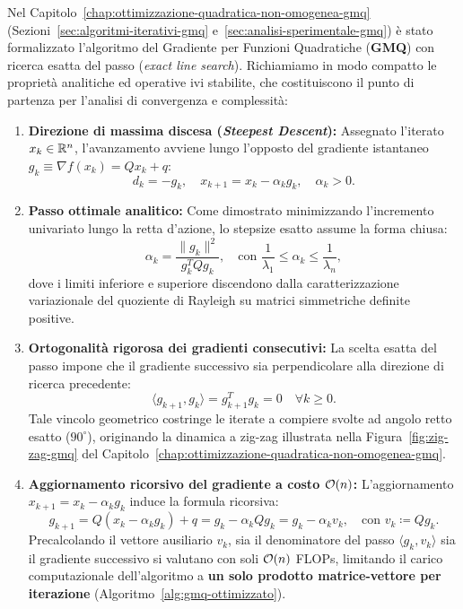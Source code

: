 Nel Capitolo~\ref{chap:ottimizzazione-quadratica-non-omogenea-gmq} (Sezioni~\ref{sec:algoritmi-iterativi-gmq} e~\ref{sec:analisi-sperimentale-gmq}) \`e stato formalizzato l'algoritmo del Gradiente per Funzioni Quadratiche (\textbf{GMQ}) con ricerca esatta del passo (\textit{exact line search}). Richiamiamo in modo compatto le propriet\`a analitiche ed operative ivi stabilite, che costituiscono il punto di partenza per l'analisi di convergenza e complessit\`a:
\begin{enumerate}
    \item \textbf{Direzione di massima discesa (\textit{Steepest Descent}):} Assegnato l'iterato $x_k \in \mathbb{R}^n$, l'avanzamento avviene lungo l'opposto del gradiente istantaneo $g_k \equiv \nabla f(x_k) = Q x_k + q$:
    \begin{equation}
        d_k = -g_k, \quad x_{k+1} = x_k - \alpha_k g_k, \quad \alpha_k > 0.
    \end{equation}
    \item \textbf{Passo ottimale analitico:} Come dimostrato minimizzando l'incremento univariato lungo la retta d'azione, lo stepsize esatto assume la forma chiusa:
    \begin{equation}
        \alpha_k = \frac{\|g_k\|^2}{g_k^T Q g_k}, \quad \text{con } \frac{1}{\lambda_1} \le \alpha_k \le \frac{1}{\lambda_n},
        \label{eq:passo-ottimo-gmq}
    \end{equation}
    dove i limiti inferiore e superiore discendono dalla caratterizzazione variazionale del quoziente di Rayleigh su matrici simmetriche definite positive.
    \item \textbf{Ortogonalit\`a rigorosa dei gradienti consecutivi:} La scelta esatta del passo impone che il gradiente successivo sia perpendicolare alla direzione di ricerca precedente:
    \begin{equation}
        \langle g_{k+1}, g_k \rangle = g_{k+1}^T g_k = 0 \quad \forall k \ge 0.
    \end{equation}
    Tale vincolo geometrico costringe le iterate a compiere svolte ad angolo retto esatto ($90^\circ$), originando la dinamica a zig-zag illustrata nella Figura~\ref{fig:zig-zag-gmq} del Capitolo~\ref{chap:ottimizzazione-quadratica-non-omogenea-gmq}.
    \item \textbf{Aggiornamento ricorsivo del gradiente a costo $\mathcal{O}\!\left(n\right)$:} L'aggiornamento $x_{k+1} = x_k - \alpha_k g_k$ induce la formula ricorsiva:
    \begin{equation}
        g_{k+1} = Q(x_k - \alpha_k g_k) + q = g_k - \alpha_k Q g_k = g_k - \alpha_k v_k, \quad \text{con } v_k \coloneqq Q g_k.
        \label{eq:aggiornamento-gradiente}
    \end{equation}
    Precalcolando il vettore ausiliario $v_k$, sia il denominatore del passo $\langle g_k, v_k \rangle$ sia il gradiente successivo si valutano con soli $\mathcal{O}\!\left(n\right)$ FLOPs, limitando il carico computazionale dell'algoritmo a \textbf{un solo prodotto matrice-vettore per iterazione} (Algoritmo~\ref{alg:gmq-ottimizzato}).
\end{enumerate}

